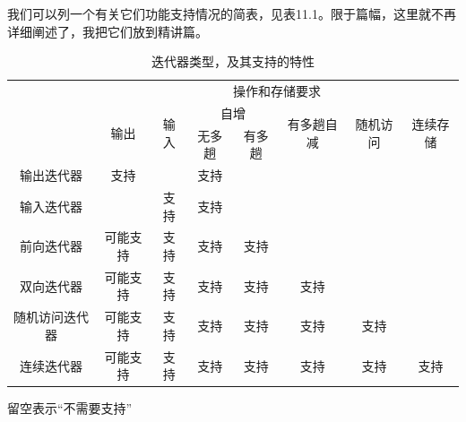 我们可以列一个有关它们功能支持情况的简表，见表11.1。限于篇幅，这里就不再详细阐述了，我把它们放到精讲篇。
\begin{table}[htbp]
\centering
\begin{tabular}{cccccccc}
\hline\rule{0pt}{2.4ex}
\multirow{3}{*}{迭代器类型} & \multicolumn{7}{c}{操作和存储要求}\\
\cline{2-8}\rule{0pt}{2.4ex}
& \multirow{2}{*}{输出} & \multirow{2}{*}{输入} & \multicolumn{2}{c}{自增} & \multirow{2}{*}{有多趟自减} & \multirow{2}{*}{随机访问} & \multirow{2}{*}{连续存储}\\
\cline{4-5}\rule{0pt}{2.4ex}
& & & 无多趟 & 有多趟 & & &\\
\hline\hline\rule{0pt}{2.4ex}
输出迭代器 & 支持 & & 支持\\
\hline\rule{0pt}{2.4ex}
输入迭代器 & & 支持 & 支持\\
\hline\rule{0pt}{2.4ex}
前向迭代器 & 可能支持 & 支持 & 支持 & 支持\\
\hline\rule{0pt}{2.4ex}
双向迭代器 & 可能支持 & 支持 & 支持 & 支持 & 支持\\
\hline\rule{0pt}{2.4ex}
随机访问迭代器 & 可能支持 & 支持 & 支持 & 支持 & 支持 & 支持\\
\hline\rule{0pt}{2.4ex}
连续迭代器 & 可能支持 & 支持 & 支持 & 支持 & 支持 & 支持 & 支持\\
\hline
\end{tabular}
\caption{迭代器类型，及其支持的特性}
\footnotesize{留空表示``不需要支持''}
\end{table}
